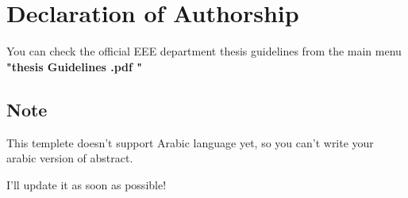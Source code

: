 \chapter*{Declaration of Authorship}


You can check the official EEE department thesis guidelines from the main menu \textbf{"thesis Guidelines .pdf "}

\section*{Note}
This templete doesn't support Arabic language yet, so you can't write your arabic version of abstract. 

I'll update it as soon as possible!